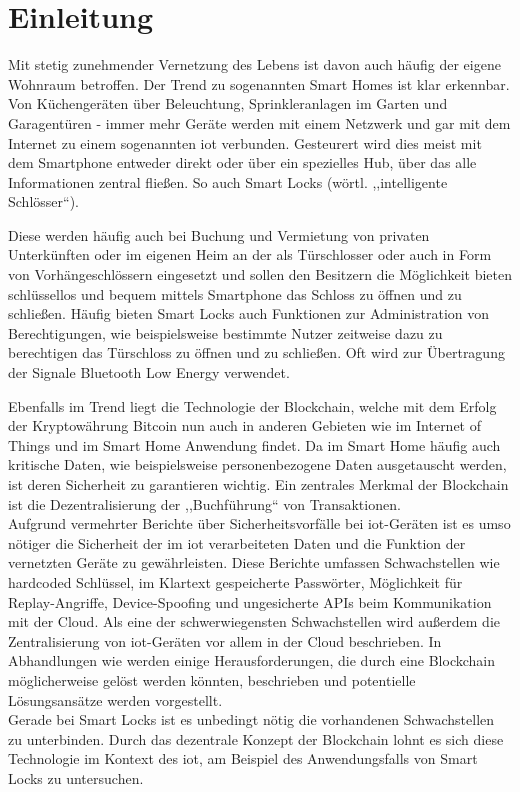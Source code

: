 \section{Einleitung}
\label{sec:intro}
    Mit stetig zunehmender Vernetzung des Lebens ist davon auch häufig der eigene Wohnraum betroffen. 
    Der Trend zu sogenannten Smart Homes ist klar erkennbar. 
    Von Küchengeräten über Beleuchtung, Sprinkleranlagen im Garten und Ga\-ra\-gen\-tü\-ren - immer mehr Geräte werden mit einem Netzwerk und gar mit dem Internet zu einem sogenannten \gls{iot} verbunden. 
    Gesteurert wird dies meist mit dem Smartphone entweder direkt oder über ein spezielles Hub, über das alle Informationen zentral fließen.
    So auch Smart Locks (wörtl. ,,intelligente Schlösser``).

    Diese werden häufig auch bei Buchung und Vermietung von privaten Unterkünften oder im eigenen Heim an der als Türschlosser oder auch in Form von Vorhängeschlössern eingesetzt und sollen den Besitzern die Möglichkeit bieten schlüssellos und bequem mittels Smartphone das Schloss zu öffnen und zu schließen.
    Häufig bieten Smart Locks auch Funktionen zur Administration von Berechtigungen, wie beispielsweise bestimmte Nutzer zeitweise dazu zu berechtigen das Türschloss zu öffnen und zu schließen.
    Oft wird zur Übertragung der Signale Bluetooth Low Energy verwendet.
    
    Ebenfalls im Trend liegt die Technologie der Blockchain, welche mit dem Erfolg der Kryptowährung Bitcoin nun auch in anderen Gebieten wie im Internet of Things und im Smart Home Anwendung findet.
    Da im Smart Home häufig auch kritische Daten, wie beispielsweise personenbezogene Daten ausgetauscht werden, ist deren Sicherheit zu garantieren wichtig.
    Ein zentrales Merkmal der Blockchain ist die Dezentralisierung der ,,Buchführung`` von Transaktionen.
    \medskip\\
    Aufgrund vermehrter Berichte über Sicherheitsvorfälle bei \gls{iot}-Geräten ist es umso nötiger die Sicherheit der im \gls{iot} verarbeiteten Daten und die Funktion der vernetzten Geräte zu gewährleisten.
    Diese Berichte umfassen Schwachstellen wie hardcoded Schlüssel, im Klartext gespeicherte Passwörter, Möglichkeit für Replay-Angriffe, Device-Spoofing\cite{Rose2016} und ungesicherte APIs beim Kommunikation mit der Cloud\cite{Stykas2018}. 
    Als eine der schwerwiegensten Schwachstellen wird außerdem die Zentralisierung von \gls{iot}-Geräten vor allem in der Cloud beschrieben\cite{Kshetri2017}.
    In Abhandlungen wie \cite{Kshetri2017} werden einige Herausforderungen, die durch eine Blockchain möglicherweise gelöst werden könnten, beschrieben und potentielle Lösungsansätze werden vorgestellt.\\
    Gerade bei Smart Locks ist es unbedingt nötig die vorhandenen Schwachstellen zu unterbinden.
    Durch das dezentrale Konzept der Blockchain\cite{Nakamoto2008} lohnt es sich diese Technologie im Kontext des \gls{iot}, am Beispiel des Anwendungsfalls von Smart Locks zu untersuchen.
    
